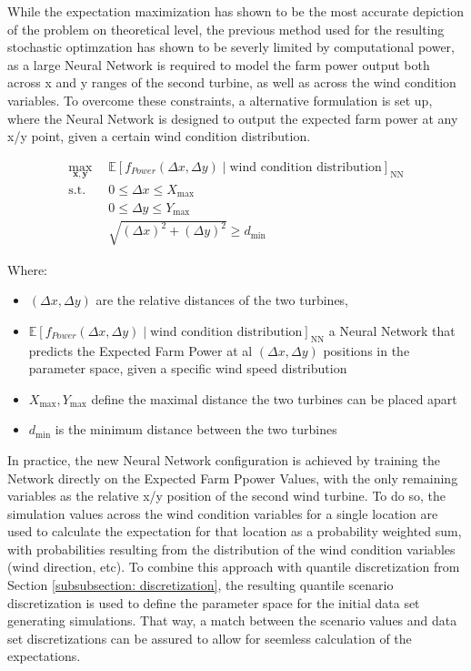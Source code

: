 \documentclass[preprint,12pt]{elsarticle}
\begin{document}
While the expectation maximization has shown to be the most accurate depiction of the problem on theoretical level, the previous method used for the resulting stochastic optimzation has shown to be severly limited by computational power, as a large Neural Network is required to model the farm power output both across x and y ranges of the second turbine, as well as across the wind condition variables. 
To overcome these constraints, a alternative formulation is set up, where the Neural Network is designed to output the expected farm power at any x/y point, given a certain wind condition distribution. 



\begin{align}
	\max_{\mathbf{x}, \mathbf{y}} &  \mathbb{E}[f_{Power}(\Delta x, \Delta y) \mid \text{wind condition distribution}]_\text{NN} \\
	\text{s.t.} \quad 
	&  0  \leq \Delta x \leq X_{\max} \\
	&  0  \leq \Delta y \leq Y_{\max} \\
	& \sqrt{(\Delta x)^2 + (\Delta y)^2} \geq d_{\min}
\end{align}

Where:
\begin{itemize}
	\item \( (\Delta x, \Delta y) \) are the relative distances of the two turbines,
	\item \( \mathbb{E}[f_{Power}(\Delta x, \Delta y) \mid \text{wind condition distribution}]_\text{NN}\) a Neural Network that predicts the Expected Farm Power at al \( (\Delta x, \Delta y) \) positions in the parameter space, given a specific wind speed distribution 
	\item \(  X_{\max}, Y_{\max} \) define the maximal distance the two turbines can be placed apart
	\item \( d_{\min} \) is the minimum distance between the two turbines
\end{itemize}

In practice, the new Neural Network configuration is achieved by training the Network directly on the Expected Farm Ppower Values, with the only remaining variables as the relative x/y position of the second wind turbine. To do so, the simulation values across the wind condition variables for a single location are used to calculate the expectation for that location as a probability weighted sum, with probabilities resulting from the distribution of the wind condition variables (wind direction, etc). To combine this approach with quantile discretization from Section \ref{subsubsection: discretization}, the resulting quantile scenario discretization is used to define the parameter space for the initial data set generating simulations. That way, a match between the scenario values and data set discretizations can be assured to allow for seemless calculation of the expectations. 
\end{document}
